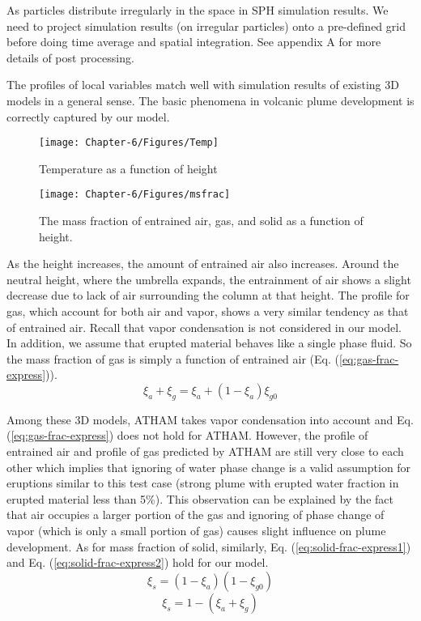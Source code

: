As particles distribute irregularly in the space in SPH simulation results. We need to project simulation results (on irregular particles) onto a pre-defined grid before doing time average and spatial integration. See appendix A for more details of post processing.

The profiles of local variables match well with simulation results of existing 3D models in a general sense. The basic phenomena in volcanic plume development is correctly captured by our model.

\begin{figure}
\center
\texttt{[image: Chapter-6/Figures/Temp]}
\caption{Temperature as a function of height}
\label{fig:strong_local_temp}
\end{figure}

\begin{figure}
\texttt{[image: Chapter-6/Figures/msfrac]}
\caption{The mass fraction of entrained air, gas, and solid as a function of height.}
\label{fig:strong_plume_mass_fraction}
\end{figure}

As the height increases, the amount of entrained air also increases. Around the neutral height, where the umbrella expands, the entrainment of air shows a slight decrease due to lack of air surrounding the column at that height. The profile for gas, which account for both air and vapor, shows a very similar tendency as that of entrained air. Recall that vapor condensation is not considered in our model. In addition, we assume that erupted material behaves like a single phase fluid. So the mass fraction of gas is simply a function of entrained air (Eq. (\ref{eq:gas-frac-express})).
\begin{equation}
\xi_a + \xi_g = \xi_a + \left(1-\xi_a\right) \xi_{g0}
\label{eq:gas-frac-express}
\end{equation}
 
Among these 3D models, ATHAM takes vapor condensation into account and Eq. (\ref{eq:gas-frac-express}) does not hold for ATHAM. However, the profile of entrained air and profile of gas predicted by ATHAM are still very close to each other which implies that ignoring of water phase change is a valid assumption for eruptions similar to this test case (strong plume with erupted water fraction in erupted material less than 5\%). This observation can be explained by the fact that air occupies a larger portion of the gas and ignoring of phase change of vapor (which is only a small portion of gas) causes slight influence on plume development. As for mass fraction of solid, similarly, Eq. (\ref{eq:solid-frac-express1}) and Eq. (\ref{eq:solid-frac-express2}) hold for our model. 
\begin{equation}
\xi_s = \left(1 - \xi_a\right) \left(1- \xi_{g0}\right)
\label{eq:solid-frac-express1}
\end{equation}
\begin{equation}
\xi_s = 1 - \left(\xi_a + \xi_g\right)
\label{eq:solid-frac-express2}
\end{equation}

